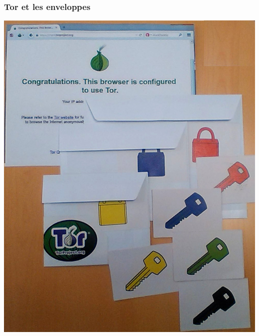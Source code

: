 \documentclass{beamer}
\begin{document}
\begin{frame}
\frametitle{Tor et les enveloppes}

\begin{center}
\includegraphics[scale=0.3] {./images/tor.jpg}
\end{center}
\end{frame}
\end{document}
